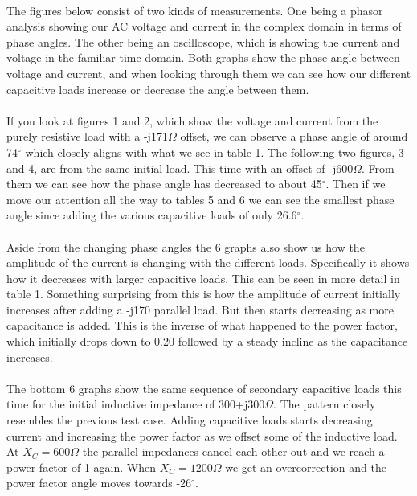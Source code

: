 



\paragraph{}The figures below consist of two kinds of measurements.
One being a phasor analysis
showing our AC voltage and current in the complex domain in terms of
phase angles. The other being
an oscilloscope, which is showing the current and voltage in the
familiar time domain. Both
graphs show the phase angle between voltage and current, and when
looking through them we can
see how our different capacitive loads increase or decrease the angle
between them.

\paragraph{}If you look at figures 1 and 2, which show the voltage
and current from the purely
resistive load with a -j171$\Omega$ offset, we can observe a phase
angle of around 74$^\circ$
which closely aligns with what we see in table 1. The following two
figures, 3 and 4,
are from the same initial load. This time with an offset of
-j600$\Omega$. From them we
can see how the phase angle has decreased to about 45$^\circ$. Then
if we move our
attention all the way to tables 5 and 6 we can see the smallest phase
angle since adding
the various capacitive loads of only 26.6$^\circ$.

\paragraph{}Aside from the changing phase angles the 6 graphs also
show us how the amplitude
of the current is changing with the different loads. Specifically it
shows how it decreases
with larger capacitive loads. This can be seen in more detail in
table 1. Something surprising
from this is how the amplitude of current initially increases after
adding a -j170 parallel
load. But then starts decreasing as more capacitance is added. This
is the inverse of what
happened to the power factor, which initially drops down to 0.20
followed by a steady incline
as the capacitance increases.

\paragraph{}The bottom 6 graphs show the same sequence of secondary
capacitive loads this
time for the initial inductive impedance of 300+j300$\Omega$. The
pattern closely resembles
the previous test case. Adding capacitive loads starts decreasing
current and increasing the
power factor as we offset some of the inductive load. At
$X_C=600\Omega$ the parallel
impedances cancel each other out and we reach a power factor of 1
again. When $X_C=1200\Omega$
we get an overcorrection and the power factor angle moves towards -26$^\circ$.

